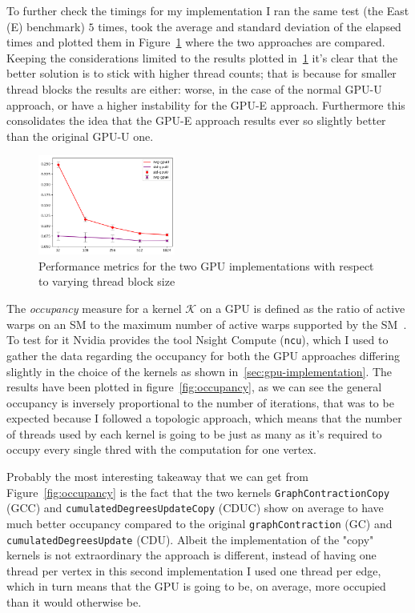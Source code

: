 \documentclass[a4paper,10pt]{article}
\begin{document}
To further check the timings for my implementation I ran the same test (the East (E) benchmark) $5$ times, took the average and standard deviation of the elapsed times and plotted them in Figure~\ref{fig:avg-std-timings} where the two approaches are compared. Keeping the considerations limited to the results plotted in~\ref{fig:avg-std-timings} it's clear that the better solution is to stick with higher thread counts; that is because for smaller thread blocks the results are either: worse, in the case of the normal GPU-U approach, or have a higher instability for the GPU-E approach. Furthermore this consolidates the idea that the GPU-E approach results ever so slightly better than the original GPU-U one.

\begin{figure} %
    \centering
    \includegraphics[width=0.4\textwidth]{fig/timings.png} %
    \caption{Performance metrics for the two GPU implementations with respect to varying thread block size}
    \label{fig:avg-std-timings}
\end{figure}
\noindent The \emph{occupancy} measure for a kernel $\mathcal{K}$ on a GPU is defined as the ratio of active warps on an SM to the maximum number of active warps supported by the SM~\cite{def-occupancy}. To test for it Nvidia provides the tool Nsight Compute (\texttt{ncu}), which I used to gather the data regarding the occupancy for both the GPU approaches differing slightly in the choice of the kernels as shown in~\ref{sec:gpu-implementation}. The results have been plotted in figure~\ref{fig:occupancy}, as we can see the general occupancy is inversely proportional to the number of iterations, that was to be expected because I followed a topologic approach, which means that the number of threads used by each kernel is going to be just as many as it's required to occupy every single thred with the computation for one vertex.

\medskip
\noindent Probably the most interesting takeaway that we can get from Figure~\ref{fig:occupancy} is the fact that the two kernels \texttt{GraphContractionCopy} (GCC) and \texttt{cumulatedDegreesUpdateCopy} (CDUC) show on average to have much better occupancy compared to the original \texttt{graphContraction} (GC) and \texttt{cumulatedDegreesUpdate} (CDU). Albeit the implementation of the "copy" kernels is not extraordinary the approach is different, instead of having one thread per vertex in this second implementation I used one thread per edge, which in turn means that the GPU is going to be, on average, more occupied than it would otherwise be.
\end{document}
